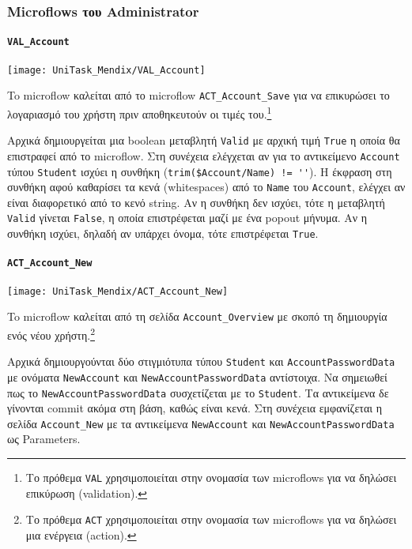             \subsubsection{Microflows του Administrator}
                \paragraph{\texttt{VAL\_Account}}
                    \begin{center}
                        \texttt{[image: UniTask\_Mendix/VAL\_Account]}
                    \end{center}

                    To microflow καλείται από το microflow \texttt{ACT\_Account\_Save} για να επικυρώσει το λογαριασμό του χρήστη πριν αποθηκευτούν οι τιμές του.\footnote{Το πρόθεμα \texttt{VAL} χρησιμοποιείται στην ονομασία των microflows για να δηλώσει επικύρωση (validation).}

                    Αρχικά δημιουργείται μια boolean μεταβλητή \texttt{Valid} με αρχική τιμή \texttt{True} η οποία θα επιστραφεί από το microflow. Στη συνέχεια ελέγχεται αν για το αντικείμενο \texttt{Account} τύπου \texttt{Student} ισχύει η συνθήκη (\verb|trim($Account/Name) != ''|). Η έκφραση στη συνθήκη αφού καθαρίσει τα κενά (whitespaces) από το \texttt{Name} του \texttt{Account}, ελέγχει αν είναι διαφορετικό από το κενό string. Αν η συνθήκη δεν ισχύει, τότε η μεταβλητή \texttt{Valid} γίνεται \texttt{False}, η οποία επιστρέφεται μαζί με ένα popout μήνυμα. Αν η συνθήκη ισχύει, δηλαδή αν υπάρχει όνομα, τότε επιστρέφεται \texttt{True}.

                \paragraph{\texttt{ACT\_Account\_New}}
                    \begin{center}
                        \texttt{[image: UniTask\_Mendix/ACT\_Account\_New]}
                    \end{center}

                    To microflow καλείται από τη σελίδα \texttt{Account\_Overview} με σκοπό τη δημιουργία ενός νέου χρήστη.\footnote{Το πρόθεμα \texttt{ACT} χρησιμοποιείται στην ονομασία των microflows για να δηλώσει μια ενέργεια (action).}

                    Αρχικά δημιουργούνται δύο στιγμιότυπα τύπου \texttt{Student} και \texttt{AccountPasswordData} με ονόματα \texttt{NewAccount} και \texttt{NewAccountPasswordData} αντίστοιχα. Να σημειωθεί πως το \texttt{NewAccountPasswordData} συσχετίζεται με το \texttt{Student}. Τα αντικείμενα δε γίνονται commit ακόμα στη βάση, καθώς είναι κενά. Στη συνέχεια εμφανίζεται η σελίδα \texttt{Account\_New} με τα αντικείμενα \texttt{NewAccount} και \texttt{NewAccountPasswordData} ως Parameters.

